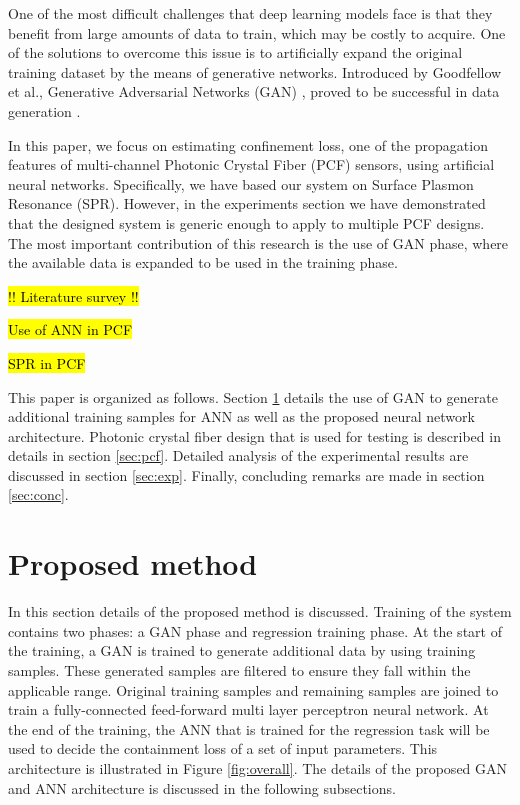 \documentclass[draft, 10pt]{IEEEtran}
\begin{document}
One of the most difficult challenges that deep learning models face is that they benefit from large amounts of data to train, which may be costly to acquire. One of the solutions to overcome this issue is to artificially expand the original training dataset by the means of generative networks. Introduced by Goodfellow et al., Generative Adversarial Networks (GAN) \cite{goodfellow2014generative}, proved to be successful in data generation \cite{schlegl2017unsupervised, zheng2017unlabeled, frid2018synthetic, tanaka2019data, perez2017effectiveness}.

In this paper, we focus on estimating confinement loss, one of the propagation features of multi-channel Photonic Crystal Fiber (PCF) sensors, using artificial neural networks. Specifically, we have based our system on Surface Plasmon Resonance (SPR). However, in the experiments section we have demonstrated that the designed system is generic enough to apply to multiple PCF designs. The most important contribution of this research is the use of GAN phase, where the available data is expanded to be used in the training phase.


\hl{!! Literature survey !!}

\hl{Use of ANN in PCF}

\hl{SPR in PCF}

This paper is organized as follows. Section \ref{sec:prop} details the use of GAN to generate additional training samples for ANN as well as the proposed neural network architecture. Photonic crystal fiber design that is used for testing is described in details in section \ref{sec:pcf}. Detailed analysis of the experimental results are discussed in section \ref{sec:exp}. Finally, concluding remarks are made in section \ref{sec:conc}.

\section{Proposed method}
\label{sec:prop}

In this section details of the proposed method is discussed. Training of the system contains two phases: a GAN phase and regression training phase. At the start of the training, a GAN is trained to generate additional data by using training samples. These generated samples are filtered to ensure they fall within the applicable range. Original training samples and remaining samples are joined to train a fully-connected feed-forward multi layer perceptron neural network. At the end of the training, the ANN that is trained for the regression task will be used to decide the containment loss  of a set of input parameters. This architecture is illustrated in Figure \ref{fig:overall}. The details of the proposed GAN and ANN architecture is discussed in the following subsections.
\end{document}
